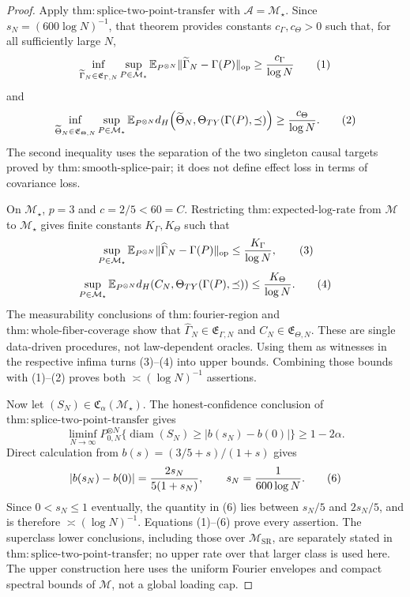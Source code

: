 \documentclass{article}
\begin{document}
\begin{proof}
Apply \(\mathrm{thm:splice\text{-}two\text{-}point\text{-}transfer}\) with \(\mathcal A=\mathcal M_\star\).  Since \(s_N=(600\log N)^{-1}\), that theorem provides constants \(c_\Gamma,c_\Theta>0\) such that, for all sufficiently large \(N\),
\[
 \inf_{\widetilde\Gamma_N\in\mathfrak E_{\Gamma,N}}
 \sup_{P\in\mathcal M_\star}
 \mathbb E_{P^{\otimes N}}\|\widetilde\Gamma_N-\Gamma(P)\|_{\mathrm{op}}
 \ge {c_\Gamma\over\log N} \tag{1}
\]
and
\[
 \inf_{\widetilde\Theta_N\in\mathfrak E_{\Theta,N}}
 \sup_{P\in\mathcal M_\star}
 \mathbb E_{P^{\otimes N}}
 d_H\!\left(\widetilde\Theta_N,
 \Theta_{TY}(\Gamma(P),\preceq)\right)
 \ge {c_\Theta\over\log N}. \tag{2}
\]
The second inequality uses the separation of the two singleton causal targets proved by \(\mathrm{thm:smooth\text{-}splice\text{-}pair}\); it does not define effect loss in terms of covariance loss.

On \(\mathcal M_\star\), \(p=3\) and \(c=2/5<60=C\).  Restricting \(\mathrm{thm:expected\text{-}log\text{-}rate}\) from \(\mathcal M\) to \(\mathcal M_\star\) gives finite constants \(K_\Gamma,K_\Theta\) such that
\[
 \sup_{P\in\mathcal M_\star}
 \mathbb E_{P^{\otimes N}}\|\widehat\Gamma_N-\Gamma(P)\|_{\mathrm{op}}
 \le {K_\Gamma\over\log N}, \tag{3}
\]
\[
 \sup_{P\in\mathcal M_\star}
 \mathbb E_{P^{\otimes N}}
 d_H(C_N,\Theta_{TY}(\Gamma(P),\preceq))
 \le {K_\Theta\over\log N}. \tag{4}
\]
The measurability conclusions of \(\mathrm{thm:fourier\text{-}region}\) and \(\mathrm{thm:whole\text{-}fiber\text{-}coverage}\) show that \(\widehat\Gamma_N\in\mathfrak E_{\Gamma,N}\) and \(C_N\in\mathfrak E_{\Theta,N}\).  These are single data-driven procedures, not law-dependent oracles.  Using them as witnesses in the respective infima turns (3)--(4) into upper bounds.  Combining those bounds with (1)--(2) proves both \(\asymp(\log N)^{-1}\) assertions.

Now let \((S_N)\in\mathfrak C_\alpha(\mathcal M_\star)\).  The honest-confidence conclusion of \(\mathrm{thm:splice\text{-}two\text{-}point\text{-}transfer}\) gives
\[
 \liminf_{N\to\infty}P_{0,N}^{\otimes N}
 \{\operatorname{diam}(S_N)\ge|b(s_N)-b(0)|\}
 \ge1-2\alpha. \tag{5}
\]
Direct calculation from \(b(s)=(3/5+s)/(1+s)\) gives
\[
 |b(s_N)-b(0)|={2s_N\over5(1+s_N)},
 \qquad s_N={1\over600\log N}. \tag{6}
\]
Since \(0<s_N\le1\) eventually, the quantity in (6) lies between \(s_N/5\) and \(2s_N/5\), and is therefore \(\asymp(\log N)^{-1}\).  Equations (1)--(6) prove every assertion.  The superclass lower conclusions, including those over \(\mathcal M_{\mathrm{SR}}\), are separately stated in \(\mathrm{thm:splice\text{-}two\text{-}point\text{-}transfer}\); no upper rate over that larger class is used here.  The upper construction here uses the uniform Fourier envelopes and compact spectral bounds of \(\mathcal M\), not a global loading cap.
\end{proof}
\end{document}
